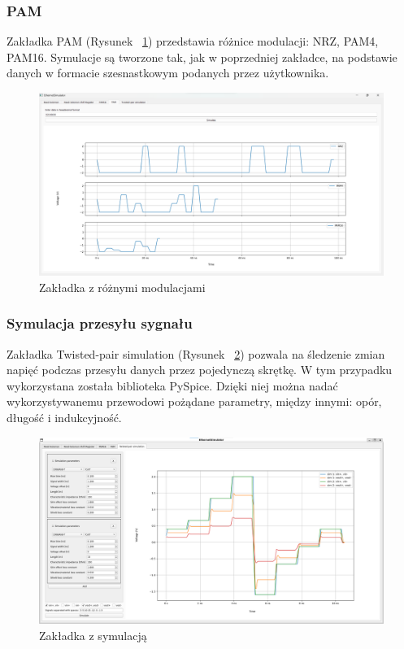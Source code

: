 \subsubsection{PAM}

Zakładka PAM (Rysunek ~\ref{fig:pam_sim_png}) przedstawia różnice modulacji: NRZ, PAM4, PAM16. Symulacje są tworzone tak, jak w poprzedniej zakładce, na podstawie danych w formacie szesnastkowym podanych przez użytkownika.

\begin{figure}[H]
    \centering
    \includegraphics[width=\textwidth]{images/pam_tab.png}
    \caption{Zakładka z różnymi modulacjami}
    \label{fig:pam_sim_png}
\end{figure}

\subsubsection{Symulacja przesyłu sygnału}
Zakładka Twisted-pair simulation (Rysunek ~\ref{fig:sim_png}) pozwala na śledzenie zmian napięć podczas przesyłu danych przez pojedynczą skrętkę. W tym przypadku wykorzystana została biblioteka PySpice. Dzięki niej można nadać wykorzystywanemu przewodowi pożądane parametry, między innymi: opór, długość i indukcyjność.

\begin{figure}[H]
    \centering
    \includegraphics[width=\textwidth]{images/sim.png}
    \caption{Zakładka z symulacją}
    \label{fig:sim_png}
\end{figure}

